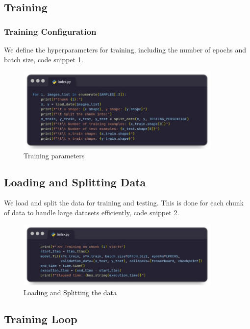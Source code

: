 \subsection{Training}
\subsubsection{Training Configuration}

We define the hyperparameters for training, including the number of epochs and batch size, code snippet \ref{fig:brain_tumor_train_params}.

\begin{figure}
 \centering
    \includegraphics[width=0.90\textwidth]{Img/Chap-01/25.jpg}
    \caption{Training parameters}
    \label{fig:brain_tumor_train_params}
\end{figure}

\subsection{Loading and Splitting Data}

We load and split the data for training and testing. This is done for each chunk of data to handle large datasets efficiently, code snippet \ref{fig:brain_tumor_data_split}.

\begin{figure}
 \centering
    \includegraphics[width=0.90\textwidth]{Img/Chap-01/26.jpg}
    \caption{  Loading and Splitting the data}
    \label{fig:brain_tumor_data_split}
\end{figure}

\subsection{Training Loop}

